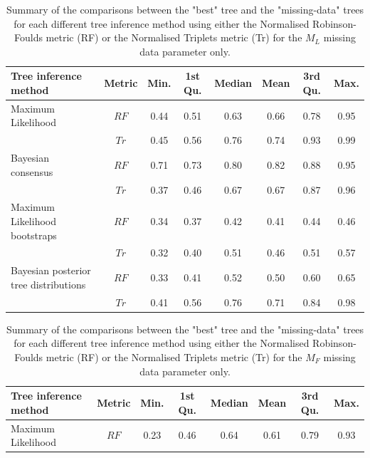 \begin{landscape}
\begin{table}[!ht]
\caption[Summary of the tree comparisons for the $M_{L}$ parameter.]{Summary of the comparisons between the "best" tree and the "missing-data" trees for each different tree inference method using either the Normalised Robinson-Foulds metric (RF) or the Normalised Triplets metric (Tr) for the $M_{L}$ missing data parameter only.}
\label{Tab_Supp_summary_metric_ML}
\centering
\begin{tabular}{lccccccc}
  \hline
 Tree inference method & Metric & Min. & 1st Qu. & Median & Mean & 3rd Qu. & Max. \\ 
  \hline
  Maximum Likelihood                    & $RF$ & 0.44 & 0.51 & 0.63 & 0.66 & 0.78 & 0.95 \\ 
                                        & $Tr$ & 0.45 & 0.56 & 0.76 & 0.74 & 0.93 & 0.99 \\ 
  Bayesian consensus                    & $RF$ & 0.71 & 0.73 & 0.80 & 0.82 & 0.88 & 0.95 \\ 
                                        & $Tr$ & 0.37 & 0.46 & 0.67 & 0.67 & 0.87 & 0.96 \\ 
  Maximum Likelihood bootstraps         & $RF$ & 0.34 & 0.37 & 0.42 & 0.41 & 0.44 & 0.46 \\ 
                                        & $Tr$ & 0.32 & 0.40 & 0.51 & 0.46 & 0.51 & 0.57 \\ 
  Bayesian posterior tree distributions & $RF$ & 0.33 & 0.41 & 0.52 & 0.50 & 0.60 & 0.65 \\ 
                                        & $Tr$ & 0.41 & 0.56 & 0.76 & 0.71 & 0.84 & 0.98 \\ 
   \hline
\end{tabular}
\end{table}
\begin{table}[!hb]
\caption[Summary of the tree comparisons for the $M_{F}$ parameter.]{Summary of the comparisons between the "best" tree and the "missing-data" trees for each different tree inference method using either the Normalised Robinson-Foulds metric (RF) or the Normalised Triplets metric (Tr) for the $M_{F}$ missing data parameter only.}
\label{Tab_Supp_summary_metric_MF}
\centering
\begin{tabular}{lccccccc}
  \hline
 Tree inference method & Metric & Min. & 1st Qu. & Median & Mean & 3rd Qu. & Max. \\ 
  \hline
  Maximum Likelihood                    & $RF$ & 0.23 & 0.46 & 0.64 & 0.61 & 0.79 & 0.93 \\ 

\end{tabular}
\end{table}
\end{landscape}
